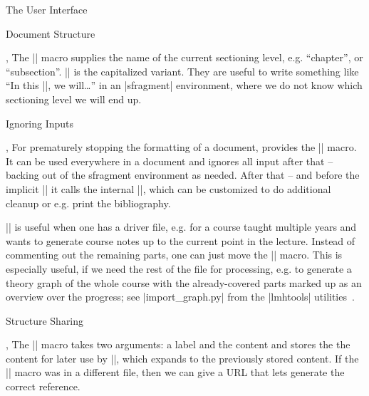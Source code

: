 \begin{sfragment}[id=sec:user]{The User Interface}
\begin{sfragment}[id=sec:user:struct]{Document Structure}
\begin{function}{\currentsectionlevel,\CurrentSectionLevel}
  The |\currentsectionlevel| macro supplies the name of the current sectioning level,
  e.g. ``chapter'', or ``subsection''. |\CurrentSectionLevel| is the capitalized
  variant. They are useful to write something like ``In this |\currentsectionlevel|, we
  will\ldots'' in an |sfragment| environment, where we do not know which sectioning level we
  will end up.
\end{function}
\end{sfragment}

\begin{sfragment}[id=sec:user:ignore]{Ignoring Inputs}

\begin{function}{\prematurestop,\afterprematurestop}
  For prematurely stopping the formatting of a document, \sTeX provides the
  |\prematurestop| macro. It can be used everywhere in a document and ignores all input
  after that -- backing out of the sfragment environment as needed. After that -- and
  before the implicit || it calls the internal |\afterprematurestop|, which
  can be customized to do additional cleanup or e.g. print the bibliography.

  |\prematurestop| is useful when one has a driver file, e.g. for a course taught multiple
  years and wants to generate course notes up to the current point in the lecture. Instead
  of commenting out the remaining parts, one can just move the |\prematurestop| macro.
  This is especially useful, if we need the rest of the file for processing, e.g. to
  generate a theory graph of the whole course with the already-covered parts marked up as
  an overview over the progress; see |import_graph.py| from the |lmhtools|
  utilities~\cite{lmhtools:github:on}.
\end{function}
\end{sfragment}

\begin{sfragment}[id=sec:user:sharing]{Structure Sharing}

\begin{function}{\STRlabel,\STRcopy}
  The |\STRlabel| macro takes two arguments: a label and the content and stores the the
  content for later use by ||, which expands to the
  previously stored content. If the |\STRlabel| macro was in a different file, then we can
  give a URL  that lets {\latexml} generate the correct reference.
\end{function}


\end{sfragment}
\end{sfragment}
